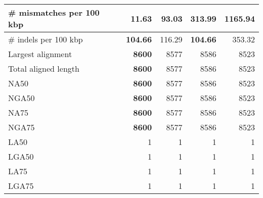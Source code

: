 \documentclass[12pt,a4paper]{article}
\begin{document}
\begin{table}[ht]
\begin{center}
\begin{tabular}{|l*{4}{|r}|}
\# mismatches per 100 kbp & {\bf 11.63} & 93.03 & 313.99 & 1165.94 \\ \hline
\# indels per 100 kbp & {\bf 104.66} & 116.29 & {\bf 104.66} & 353.32 \\ \hline
Largest alignment & {\bf 8600} & 8577 & 8586 & 8523 \\ \hline
Total aligned length & {\bf 8600} & 8577 & 8586 & 8523 \\ \hline
NA50 & {\bf 8600} & 8577 & 8586 & 8523 \\ \hline
NGA50 & {\bf 8600} & 8577 & 8586 & 8523 \\ \hline
NA75 & {\bf 8600} & 8577 & 8586 & 8523 \\ \hline
NGA75 & {\bf 8600} & 8577 & 8586 & 8523 \\ \hline
LA50 & 1 & 1 & 1 & 1 \\ \hline
LGA50 & 1 & 1 & 1 & 1 \\ \hline
LA75 & 1 & 1 & 1 & 1 \\ \hline
LGA75 & 1 & 1 & 1 & 1 \\ \hline
\end{tabular}
\end{center}
\end{table}
\end{document}
